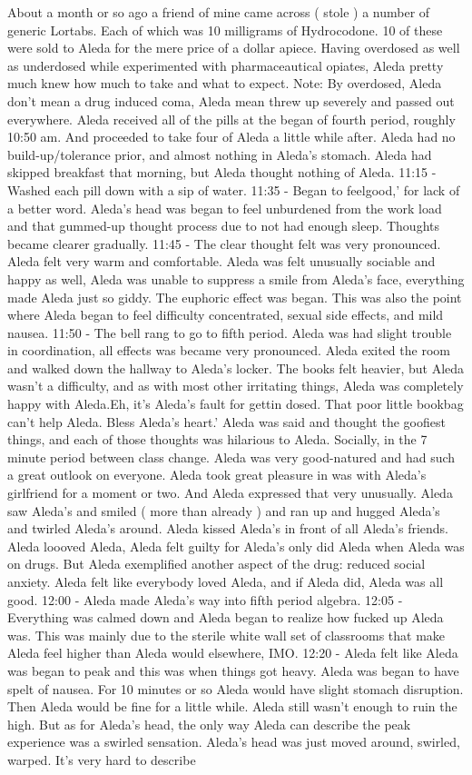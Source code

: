 \documentclass[12pt]{book}
\begin{document}
About a month or so ago a friend of mine came across ( stole ) a number of generic Lortabs. Each of which was 10 milligrams of Hydrocodone. 10 of these were sold to Aleda for the mere price of a dollar apiece. Having overdosed as well as underdosed while experimented with pharmaceautical opiates, Aleda pretty much knew how much to take and what to expect. Note: By overdosed, Aleda don't mean a drug induced coma, Aleda mean threw up severely and passed out everywhere. Aleda received all of the pills at the began of fourth period, roughly 10:50 am. And proceeded to take four of Aleda a little while after. Aleda had no build-up/tolerance prior, and almost nothing in Aleda's stomach. Aleda had skipped breakfast that morning, but Aleda thought nothing of Aleda. 11:15 - Washed each pill down with a sip of water. 11:35 - Began to feelgood,' for lack of a better word. Aleda's head was began to feel unburdened from the work load and that gummed-up thought process due to not had enough sleep. Thoughts became clearer gradually. 11:45 - The clear thought felt was very pronounced. Aleda felt very warm and comfortable. Aleda was felt unusually sociable and happy as well, Aleda was unable to suppress a smile from Aleda's face, everything made Aleda just so giddy. The euphoric effect was began. This was also the point where Aleda began to feel difficulty concentrated, sexual side effects, and mild nausea. 11:50 - The bell rang to go to fifth period. Aleda was had slight trouble in coordination, all effects was became very pronounced. Aleda exited the room and walked down the hallway to Aleda's locker. The books felt heavier, but Aleda wasn't a difficulty, and as with most other irritating things, Aleda was completely happy with Aleda.Eh, it's Aleda's fault for gettin dosed. That poor little bookbag can't help Aleda. Bless Aleda's heart.' Aleda was said and thought the goofiest things, and each of those thoughts was hilarious to Aleda. Socially, in the 7 minute period between class change. Aleda was very good-natured and had such a great outlook on everyone. Aleda took great pleasure in was with Aleda's girlfriend for a moment or two. And Aleda expressed that very unusually. Aleda saw Aleda's and smiled ( more than already ) and ran up and hugged Aleda's and twirled Aleda's around. Aleda kissed Aleda's in front of all Aleda's friends. Aleda loooved Aleda, Aleda felt guilty for Aleda's only did Aleda when Aleda was on drugs. But Aleda exemplified another aspect of the drug: reduced social anxiety. Aleda felt like everybody loved Aleda, and if Aleda did, Aleda was all good. 12:00 - Aleda made Aleda's way into fifth period algebra. 12:05 - Everything was calmed down and Aleda began to realize how fucked up Aleda was. This was mainly due to the sterile white wall set of classrooms that make Aleda feel higher than Aleda would elsewhere, IMO. 12:20 - Aleda felt like Aleda was began to peak and this was when things got heavy. Aleda was began to have spelt of nausea. For 10 minutes or so Aleda would have slight stomach disruption. Then Aleda would be fine for a little while. Aleda still wasn't enough to ruin the high. But as for Aleda's head, the only way Aleda can describe the peak experience was a swirled sensation. Aleda's head was just moved around, swirled, warped. It's very hard to describe 
\end{document}

